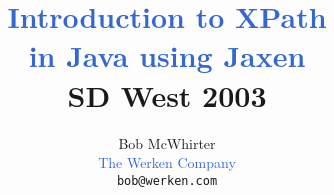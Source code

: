\documentclass[20pt,landscape,headrule,footrule]{foils}
\begin{document}

\renewcommand{\emph}[1]{\textcolor{highlight}{#1}}
\newcommand{\bemph}[1]{\textbf{\emph{#1}}}
\newcommand{\hired}[1]{\textcolor{red}{#1}}
\newcommand{\hipurple}[1]{\textcolor{hipurple}{#1}}
\newcommand{\hiblue}[1]{\textcolor{blue}{#1}}
\newcommand{\higreen}[1]{\textcolor{higreen}{#1}}
\newcommand{\hifade}[1]{\textcolor{grey}{#1}}
\newcommand{\slide}[1]{\foilhead{\bemph{#1}}}
\newcommand{\subslide}[1]{\foilhead{\bemph{\small{(#1)}}}}
\newcommand{\breakslide}[1]{\foilhead{}\vspace{1in}\begin{center}\Huge{\textcolor{highlight}{ #1}}\end{center}}
\newcommand{\egxpath}[1]{\begin{center}\texttt{#1}\end{center}}
\newcommand{\egcode}[1]{\begin{center}\texttt{#1}\end{center}}
\newcommand{\at}[0]{\texttt{\@@}}
\newcommand{\tag}[1]{\texttt{<#1>}}

\newenvironment{codelisting}%
        {\begin{minipage}{\textwidth}\tiny\begin{alltt}}%
        {\end{alltt}\end{minipage}}

\newcommand{\diagram}[1]{
  \begin{minipage}{\textwidth}
    \begin{center}
      \texttt{[image: \#1]}
    \end{center}
  \end{minipage}
}

\title{\emph{Introduction to XPath\\
       in Java using Jaxen}\\
       \small{SD West 2003}}

\author{Bob McWhirter\\
        \tiny{\emph{The Werken Company}}\\
        \tiny{\texttt{bob@werken.com}}}

\MyLogo{\emph{http://jaxen.org/}}

\leftheader{\emph{Jaxen}}

\maketitle
\end{document}
